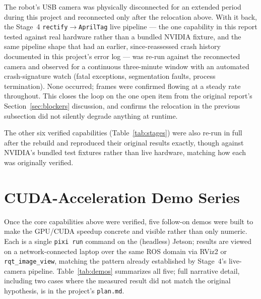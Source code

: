 \documentclass[11pt,a4paper]{article}
\begin{document}
The robot's USB camera was physically disconnected for an extended
period during this project and reconnected only after the relocation
above. With it back, the Stage~4 \texttt{rectify}$\to$\texttt{AprilTag}
live pipeline --- the one capability in this report tested against real
hardware rather than a bundled NVIDIA fixture, and the same pipeline
shape that had an earlier, since-reassessed crash history documented in
this project's error log --- was re-run against the reconnected camera
and observed for a continuous three-minute window with an automated
crash-signature watch (fatal exceptions, segmentation faults, process
termination). None occurred; frames were confirmed flowing at a steady
rate throughout. This closes the loop on the one open item from the
original report's Section~\ref{sec:blockers} discussion, and confirms
the relocation in the previous subsection did not silently degrade
anything at runtime.

The other six verified capabilities (Table~\ref{tab:stages}) were also
re-run in full after the rebuild and reproduced their original results
exactly, though against NVIDIA's bundled test fixtures rather than live
hardware, matching how each was originally verified.

\section{CUDA-Acceleration Demo Series}
\label{sec:demos}

Once the core capabilities above were verified, five follow-on demos were
built to make the GPU/CUDA speedup concrete and visible rather than only
numeric. Each is a single \texttt{pixi run} command on the (headless)
Jetson; results are viewed on a network-connected laptop over the same
ROS domain via RViz2 or \texttt{rqt\_image\_view}, matching the pattern
already established by Stage~4's live-camera pipeline. Table~\ref{tab:demos}
summarizes all five; full narrative detail, including two cases where the
measured result did not match the original hypothesis, is in the
project's \texttt{plan.md}.
\end{document}
